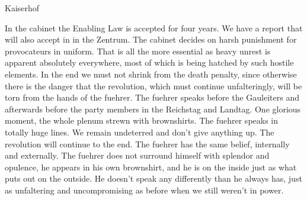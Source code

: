 Kaiserhof

In the cabinet the Enabling Law is accepted for four years. We have a report that will also accept in in the Zentrum. The cabinet decides on harsh punishment for provocateurs in uniform. That is all the more essential as heavy unrest is apparent absolutely everywhere, most of which is being hatched by such hostile elements.  In the end we must not shrink from the death penalty, since otherwise there is the danger that the revolution, which must continue unfalteringly, will be torn from the hands of the fuehrer. The fuehrer speaks before the Gauleiters and afterwards before the party members in the Reichstag and Landtag. One glorious moment, the whole plenum strewn with brownshirts. The fuehrer speaks in totally huge lines. We remain undeterred and don't give anything up. The revolution will continue to the end. The fuehrer has the same belief, internally and externally. The fuehrer does not surround himself with splendor and opulence, he appears in his own brownshirt, and he is on the inside just as what puts out on the outside. He doesn't speak any differently than he always has, just as unfaltering and uncompromising as before when we still weren't in power.
